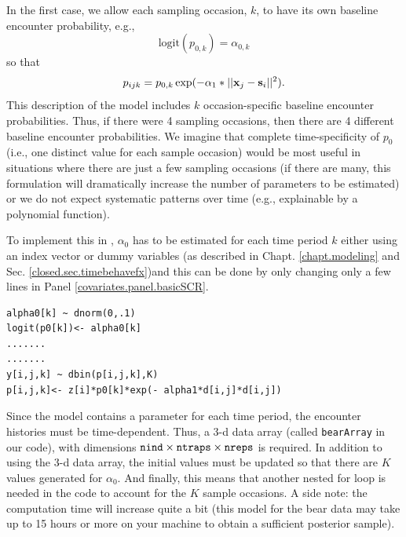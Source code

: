 In the first case, we allow each sampling occasion, $k$, to have its
own baseline encounter probability, e.g.,
\[
\mbox{logit}(p_{0,k}) = \alpha_{0,k}
\]
so that
\[
p_{ijk} = p_{0,k} \exp(- \alpha_1*||{\bf x}_{j}-{\bf s}_{i}||^2).
\]
This description of the model includes $k$ occasion-specific baseline
encounter probabilities.  Thus, if there were 4 sampling occasions, then
there are 4 different baseline encounter probabilities.  We imagine
that complete time-specificity of $p_{0}$ 
(i.e., one distinct value for each sample occasion)
would be most useful in situations
where there are just a few sampling occasions (if there are many, this
formulation will dramatically increase the number of parameters to be
estimated) or we do not expect systematic patterns over time (e.g.,
explainable by a polynomial function).

To implement this in \jags, $\alpha_0$ has to be
estimated for each time period $k$ either using an index vector or
dummy variables (as described in Chapt. \ref{chapt.modeling} and Sec. 
\ref{closed.sec.timebehavefx})and this can be done by only 
changing only a few lines in Panel \ref{covariates.panel.basicSCR}.

\begin{verbatim}
alpha0[k] ~ dnorm(0,.1)
logit(p0[k])<- alpha0[k]
.......
.......
y[i,j,k] ~ dbin(p[i,j,k],K)
p[i,j,k]<- z[i]*p0[k]*exp(- alpha1*d[i,j]*d[i,j])
\end{verbatim}

Since the model contains a parameter for each time period, the
encounter histories must be time-dependent.  Thus, a 3-d data array
(called \mbox{\tt bearArray} in our code), with dimensions $\mbox{\tt
  nind} \times \mbox{\tt ntraps} \times \mbox{\tt nreps}$ is
required. In addition to using the 3-d data array, the initial values
must be updated so that there are $K$ values generated for $\alpha_0$.
And finally, this means that another nested for loop is needed
in the code to account for the $K$ sample occasions.  A side note: the
computation time will increase quite a bit (this model for the bear
data may take up to 15 hours or more on your machine to obtain a
sufficient posterior sample).

